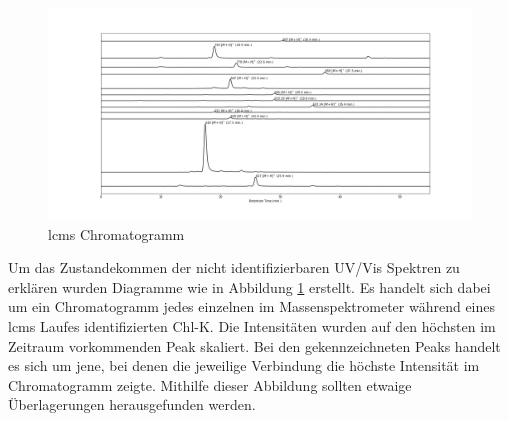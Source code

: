 \begin{figure}[!htbp]
  \includegraphics[width=\textwidth]{figures/Kapitel6/keineReaktion/Kuerbis_Analyse_keineReaktion2_LC-ESI-MS.png}
  \caption[LC-MS Chromatogramm Aufspaltung, Quelle: Author]{\gls{lcms} Chromatogramm}
  \label{fig:LCMSChromatogrammAufspaltung}
\end{figure} 

Um das Zustandekommen der nicht identifizierbaren UV/Vis Spektren zu erklären wurden Diagramme wie in Abbildung \ref{fig:LCMSChromatogrammAufspaltung} erstellt. Es handelt sich dabei um ein Chromatogramm jedes einzelnen im Massenspektrometer während eines \gls{lcms} Laufes identifizierten \gls{Chl-K}. Die Intensitäten wurden auf den höchsten im Zeitraum vorkommenden Peak skaliert. Bei den gekennzeichneten Peaks handelt es sich um jene, bei denen die jeweilige Verbindung die höchste Intensität im Chromatogramm zeigte. Mithilfe dieser Abbildung sollten etwaige Überlagerungen herausgefunden werden. 

